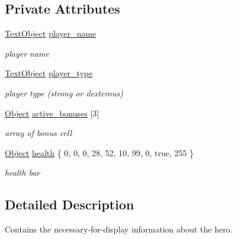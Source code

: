 \subsection*{Private Attributes}
\begin{DoxyCompactItemize}
\item 
\mbox{\label{class_player_u_i_ab9651a40a71fc4c84fad8e3d626a3386}} 
\hyperlink{class_text_object}{Text\+Object} \hyperlink{class_player_u_i_ab9651a40a71fc4c84fad8e3d626a3386}{player\+\_\+name}
\begin{DoxyCompactList}\small\item\em player name \end{DoxyCompactList}\item 
\mbox{\label{class_player_u_i_a97dbafa8c5c0a651d62d25abbca726a1}} 
\hyperlink{class_text_object}{Text\+Object} \hyperlink{class_player_u_i_a97dbafa8c5c0a651d62d25abbca726a1}{player\+\_\+type}
\begin{DoxyCompactList}\small\item\em player type (strong or dexterous) \end{DoxyCompactList}\item 
\mbox{\label{class_player_u_i_ae72b43eec4a8060f917d38516e715da2}} 
\hyperlink{class_object}{Object} \hyperlink{class_player_u_i_ae72b43eec4a8060f917d38516e715da2}{active\+\_\+bonuses} \mbox{[}3\mbox{]}
\begin{DoxyCompactList}\small\item\em array of bonus cell \end{DoxyCompactList}\item 
\mbox{\label{class_player_u_i_a5ca02efb3a04ec5661789dd97d6676fb}} 
\hyperlink{class_object}{Object} \hyperlink{class_player_u_i_a5ca02efb3a04ec5661789dd97d6676fb}{health} \{ 0, 0, 0, 28, 52, 10, 99, 0, true, 255 \}
\begin{DoxyCompactList}\small\item\em health bar \end{DoxyCompactList}\end{DoxyCompactItemize}


\subsection{Detailed Description}
Contains the necessary-\/for-\/display information about the hero. 


